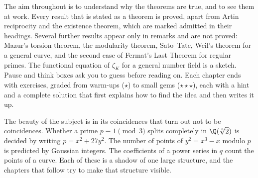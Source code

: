 The aim throughout is to understand why the theorems are true, and to see them at work. Every result that is stated as a theorem is proved, apart from Artin reciprocity and the existence theorem, which are marked admitted in their headings. Several further results appear only in remarks and are not proved: Mazur's torsion theorem, the modularity theorem, Sato--Tate, Weil's theorem for a general curve, and the second case of Fermat's Last Theorem for regular primes. The functional equation of $\zeta_K$ for a general number field is a sketch. Pause
and think boxes ask you to guess before reading on. Each chapter ends with exercises, graded from warm-ups
($\star$) to small gems ($\star\star\star$), each with a hint and a complete solution that first explains how to find
the idea and then writes it up.

The beauty of the subject is in its coincidences that turn out not to be coincidences. Whether a prime $p\equiv1\pmod 3$ splits completely in
$\Q(\sqrt[3]2)$ is decided by writing $p=x^2+27y^2$. The number of points of $y^2=x^3-x$ modulo $p$ is predicted by
Gaussian integers. The coefficients of a power series in $q$ count the points of a curve. Each of these is a shadow of
one large structure, and the chapters that follow try to make that structure visible.
